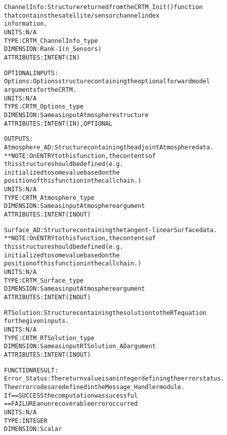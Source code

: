 \begin{alltt}
        ChannelInfo:    Structure returned from the CRTM_Init() function
                        that contains the satellite/sensor channel index
                        information.
                        UNITS:      N/A
                        TYPE:       CRTM_ChannelInfo_type
                        DIMENSION:  Rank-1 (n_Sensors)
                        ATTRIBUTES: INTENT(IN)
 
  OPTIONAL INPUTS:
        Options:        Options structure containing the optional forward model
                        arguments for the CRTM.
                        UNITS:      N/A
                        TYPE:       CRTM_Options_type
                        DIMENSION:  Same as input Atmosphere structure
                        ATTRIBUTES: INTENT(IN), OPTIONAL
 
  OUTPUTS:
        Atmosphere_AD:  Structure containing the adjoint Atmosphere data.
                        **NOTE: On ENTRY to this function, the contents of
                                this structure should be defined (e.g.
                                initialized to some value based on the
                                position of this function in the call chain.)
                        UNITS:      N/A
                        TYPE:       CRTM_Atmosphere_type
                        DIMENSION:  Same as input Atmosphere argument
                        ATTRIBUTES: INTENT(IN OUT)
 
        Surface_AD:     Structure containing the tangent-linear Surface data.
                        **NOTE: On ENTRY to this function, the contents of
                                this structure should be defined (e.g.
                                initialized to some value based on the
                                position of this function in the call chain.)
                        UNITS:      N/A
                        TYPE:       CRTM_Surface_type
                        DIMENSION:  Same as input Atmosphere argument
                        ATTRIBUTES: INTENT(IN OUT)
 
        RTSolution:     Structure containing the solution to the RT equation
                        for the given inputs.
                        UNITS:      N/A
                        TYPE:       CRTM_RTSolution_type
                        DIMENSION:  Same as input RTSolution_AD argument
                        ATTRIBUTES: INTENT(IN OUT)
 
  FUNCTION RESULT:
        Error_Status:   The return value is an integer defining the error status.
                        The error codes are defined in the Message_Handler module.
                        If == SUCCESS the computation was sucessful
                           == FAILURE an unrecoverable error occurred
                        UNITS:      N/A
                        TYPE:       INTEGER
                        DIMENSION:  Scalar
 

\end{alltt}
